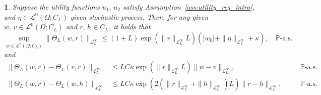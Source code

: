 \documentclass[11pt,oneside,english,reqno,dvipsnames,table]{amsart}
\numberwithin{equation}{section}
\theoremstyle{plain}
\theoremstyle{definition}
\theoremstyle{remark}
\theoremstyle{plain}
\theoremstyle{plain}
\newtheorem{prop}[thm]{\protect\propositionname}
\theoremstyle{plain}
\theoremstyle{plain}
\theoremstyle{plain}
\theoremstyle{plain}
\theoremstyle{plain}
\providecommand{\propositionname}{Proposition}
\newcommand{\scL}{\mathscr{L}}
\newcommand{\mbP}{\mathbb{P}}
\newcommand{\msL}{\mathscr{L}}
\numberwithin{thm}{section}
\begin{document}
\begin{prop}\label{prop:life_cycle_wealth_stability}
    Suppose the utility functions $u_1,\, u_2$ satisfy Assumption~\ref{ass:utility_reg_intro}, and $\eta\in \scL^0(\Omega;C_L)$  given stochastic process.  Then, for any given $w,\, v \in \scL^0(\Omega;C_L)$ and $r,\,h\in C_L$, it holds that
    \begin{equation}\label{eq:apriori_bound}
     \sup_{w\in \scL^0(\Omega;C_L)} \|\Theta_L(w,r)\|_{\msL^\infty_L}  \leq (1+L)\exp(\|r\|_{\msL^\infty_L}L) \left(|w_0| +  \|\eta\|_{\msL^\infty_L}+ \kappa \right),\quad \mbP\text{-a.s.}
    \end{equation}
    and
    \begin{equation*}
    \begin{aligned}
         \|\Theta_L(w,r)- \Theta_L(v,r)\|_{\msL^\infty_L} &\leq L C \kappa \exp(\|r\|_{\msL^\infty_L} L) \|w-v\|_{\msL^\infty_L}, \quad &&\mbP\text{-a.s.}
         \\
          \|\Theta_L(w,r)- \Theta_L(w,h)\|_{\msL^\infty_L} &\leq L C \kappa \exp(2(\|r\|_{\msL^\infty_L}+\|h\|_{\msL^\infty_L}) L) \|r-h\|_{\msL^\infty_L}, \quad &&\mbP\text{-a.s.} 
    \end{aligned}
    \end{equation*}
\end{prop}
\end{document}
